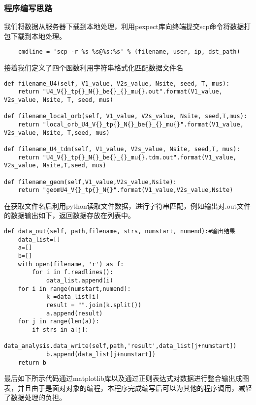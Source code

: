 \subsubsection{程序编写思路}
我们将数据从服务器下载到本地处理，利用pexpect库向终端提交scp命令将数据打包下载到本地处理\cite{}。
\begin{lstlisting}
    cmdline = 'scp -r %s %s@%s:%s' % (filename, user, ip, dst_path)
\end{lstlisting}
接着我们定义了四个函数利用字符串格式化匹配数据文件名
\begin{lstlisting}
def filename_U4(self, V1_value, V2s_value, Nsite, seed, T, mus):
    return "U4_V{}_tp{}_N{}_be{}_{}_mu{}.out".format(V1_value, V2s_value, Nsite, T, seed, mus)

def filename_local_orb(self, V1_value, V2s_value, Nsite, seed,T,mus):
    return "local_orb_U4_V{}_tp{}_N{}_be{}_{}_mu{}".format(V1_value, V2s_value, Nsite, T,seed, mus)

def filename_U4_tdm(self, V1_value, V2s_value, Nsite, seed,T, mus):
    return "U4_V{}_tp{}_N{}_be{}_{}_mu{}.tdm.out".format(V1_value, V2s_value, Nsite,T,seed, mus)

def filename_geom(self,V1_value,V2s_value,Nsite):
    return "geomU4_V{}_tp{}_N{}".format(V1_value,V2s_value,Nsite)
\end{lstlisting}
在获取文件名后利用python读取文件数据，进行字符串匹配，例如输出对.out文件的数据输出如下，返回数据存放在列表中。
\begin{lstlisting}
def data_out(self, path,filename, strs, numstart, numend):#输出结果
    data_list=[]
    a=[]
    b=[]
    with open(filename, 'r') as f:
        for i in f.readlines():
            data_list.append(i)
    for i in range(numstart,numend):
            k =data_list[i]
            result = "".join(k.split())
            a.append(result)
    for j in range(len(a)):
        if strs in a[j]:
            data_analysis.data_write(self,path,'result',data_list[j+numstart])
            b.append(data_list[j+numstart])
    return b
\end{lstlisting}
最后如下所示代码通过matplotlib库以及通过正则表达式对数据进行整合输出成图表，并且由于是面对对象的编程，本程序完成编写后可以为其他的程序调用，减轻了数据处理的负担。
